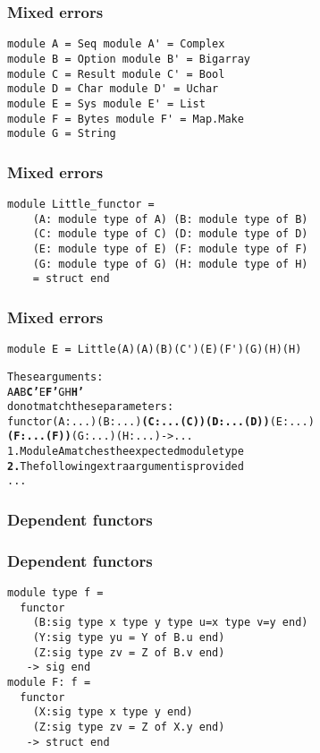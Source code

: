 \documentclass[a4paper,11pt]{beamer}
\begin{document}
\begin{frame}[fragile]\frametitle{Mixed errors}
\begin{verbatim}
module A = Seq module A' = Complex
module B = Option module B' = Bigarray
module C = Result module C' = Bool
module D = Char module D' = Uchar
module E = Sys module E' = List
module F = Bytes module F' = Map.Make
module G = String
\end{verbatim}
\end{frame}
\begin{frame}[fragile]\frametitle{Mixed errors}
\begin{verbatim}
module Little_functor =
    (A: module type of A) (B: module type of B)
    (C: module type of C) (D: module type of D)
    (E: module type of E) (F: module type of F)
    (G: module type of G) (H: module type of H)
    = struct end
\end{verbatim}
\end{frame}

\begin{frame}[fragile]\frametitle{Mixed errors}
\begin{verbatim}
module E = Little(A)(A)(B)(C')(E)(F')(G)(H)(H)
\end{verbatim}
\begin{alltt}
These arguments:
  {\color{green}{}A} {\color{red}{}\bfseries{}A} {\color{green}{}B} {\color{magenta}{}\bfseries{}C'} {\color{red}{}\bfseries{}} {\color{green}{}E} {\color{magenta}{}\bfseries{}F'} {\color{green}{}G} {\color{green}{}H} {\color{red}{}\bfseries{}H'}
do not match these parameters:
  functor {\color{green}{}(A : ...)} {\color{red}{}\bfseries{}} {\color{green}{}(B : ...)} {\color{magenta}{}\bfseries{}(C : ...(C))} {\color{red}{}\bfseries{}(D : ...(D))} {\color{green}{}(E : ...)}
  {\color{magenta}{}\bfseries{}(F : ...(F))} {\color{green}{}(G : ...)} {\color{green}{}(H : ...)} {\color{red}{}\bfseries{}} -> ...
{\color{green}{}1.} Module A matches the expected module type
{\color{red}{}\bfseries{}2.} The following extra argument is provided
  ...
\end{alltt}
\end{frame}

\begin{frame}[fragile]\frametitle{Dependent functors}
\end{frame}


\begin{frame}[fragile]\frametitle{Dependent functors}
\begin{verbatim}
module type f =
  functor
    (B:sig type x type y type u=x type v=y end)
    (Y:sig type yu = Y of B.u end)
    (Z:sig type zv = Z of B.v end)
   -> sig end
module F: f =
  functor
    (X:sig type x type y end)
    (Z:sig type zv = Z of X.y end)
   -> struct end
\end{verbatim}
\end{frame}
\end{document}

